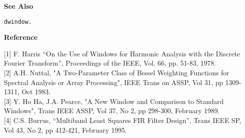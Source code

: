 
{\bf \large {}\selectfont See Also}\\
\hspace*{1.5cm}
\begin{minipage}[t]{13.5cm}
\begin{verbatim}
dwindow.
\end{verbatim}
\end{minipage}
\vspace*{.5cm}


{\bf \large {}\selectfont Reference}\\
\hspace*{1.5cm}
\begin{minipage}[t]{13.5cm}
[1] F. Harris ``On the Use of Windows for Harmonic Analysis with the
Discrete Fourier Transform'', Proceedings of the IEEE, Vol. 66, pp. 51-83,
1978.\\

[2] A.H. Nuttal, "A Two-Parameter Class of Bessel Weighting 
	Functions for Spectral Analysis or Array Processing", 
	IEEE Trans on ASSP, Vol 31, pp 1309-1311, Oct 1983.\\

[3] Y. Ho Ha, J.A. Pearce, "A New Window and Comparison to
	Standard Windows", Trans IEEE ASSP, Vol 37, No 2, 
	pp 298-300, February 1989.\\

[4] C.S. Burrus, ``Multiband Least Squares FIR Filter Design'',
	Trans IEEE SP, Vol 43, No 2, pp 412-421, February 1995.
\end{minipage}

